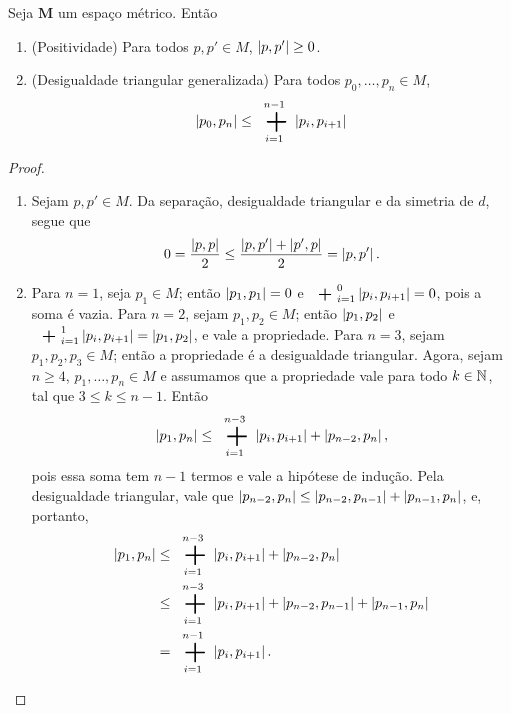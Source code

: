 \begin{proposition}
Seja $\bm M$ um espaço métrico. Então
	\begin{enumerate}
	\item (Positividade) Para todos $p,p' \in M$, $\left\vert{p},{p'}\right\vert \geq 0$.
	\item (Desigualdade triangular generalizada) Para todos $p_0,\ldots,p_n \in M$,
		\begin{equation*}
		\dist{p_0}{p_n} \leq \sum_{i=1}^{n-1} \dist{p_i}{p_{i+1}}
		\end{equation*}
	\end{enumerate}
\end{proposition}
\begin{proof}
	\begin{enumerate}
	\item Sejam $p,p' \in M$. Da separação, desigualdade triangular e da simetria de $d$, segue que
	\begin{equation*}
	0 = \frac{\left\vert{p},{p}\right\vert}{2} \leq \frac{\left\vert{p},{p'}\right\vert + \left\vert{p'},{p}\right\vert}{2}= \left\vert{p},{p'}\right\vert.
	\end{equation*}

	\item Para $n=1$, seja $p_1 \in M$; então $\left\vert{p_1},{p_1}\right\vert=0$ e $\sum_{i=1}^{0} \dist{p_i}{p_{i+1}}=0$, pois a soma é vazia. Para $n=2$, sejam $p_1,p_2 \in M$; então $\left\vert{p_1},{p_2}\right\vert$ e $\sum_{i=1}^{1} \dist{p_i}{p_{i+1}}=\dist{p_1}{p_2}$, e vale a propriedade. Para $n=3$, sejam $p_1,p_2,p_3 \in M$; então a propriedade é a desigualdade triangular. Agora, sejam $n \geq 4$, $p_1,\ldots,p_n \in M$ e assumamos que a propriedade vale para todo $k \in \mathbb{N}$, tal que $3 \leq k \leq n-1$. Então
	\begin{equation*}
	\dist{p_1}{p_n} \leq \sum_{i=1}^{n-3} \dist{p_i}{p_{i+1}}+\dist{p_{n-2}}{p_n},
	\end{equation*}
	pois essa soma tem $n-1$ termos e vale a hipótese de indução. Pela desigualdade triangular, vale que $\left\vert{p_{n-2}},{p_n}\right\vert \leq \left\vert{p_{n-2}},{p_{n-1}}\right\vert+\left\vert{p_{n-1}},{p_n}\right\vert$, e, portanto,
	\begin{align*}
	\dist{p_1}{p_n} &\leq \sum_{i=1}^{n-3} \dist{p_i}{p_{i+1}}+\dist{p_{n-2}}{p_n} \\
			&\leq \sum_{i=1}^{n-3} \dist{p_i}{p_{i+1}} + \dist{p_{n-2}}{p_{n-1}}+\dist{p_{n-1}}{p_n} \\
			&= \sum_{i=1}^{n-1} \dist{p_i}{p_{i+1}}.
	\end{align*}
	\end{enumerate}
\end{proof}

